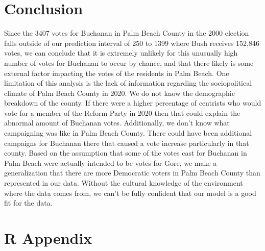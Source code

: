 \documentclass[
  letterpaper,
  DIV=11,
  numbers=noendperiod]{scrartcl}
\begin{document}
\hypertarget{conclusion}{%
\section{Conclusion}\label{conclusion}}

Since the 3407 votes for Buchanan in Palm Beach County in the 2000
election falls outside of our prediction interval of 250 to 1399 where
Bush receives 152,846 votes, we can conclude that it is extremely
unlikely for this unusually high number of votes for Buchanan to occur
by chance, and that there likely is some external factor impacting the
votes of the residents in Palm Beach. One limitation of this analysis is
the lack of information regarding the sociopolitical climate of Palm
Beach County in 2020. We do not know the demographic breakdown of the
county. If there were a higher percentage of centrists who would vote
for a member of the Reform Party in 2020 then that could explain the
abnormal amount of Buchanan votes. Additionally, we don't know what
campaigning was like in Palm Beach County. There could have been
additional campaigns for Buchanan there that caused a vote increase
particularly in that county. Based on the assumption that some of the
votes cast for Buchanan in Palm Beach were actually intended to be votes
for Gore, we make a generalization that there are more Democratic voters
in Palm Beach County than represented in our data. Without the cultural
knowledge of the environment where the data comes from, we can't be
fully confident that our model is a good fit for the data.

\hypertarget{r-appendix}{%
\section{R Appendix}\label{r-appendix}}
\end{document}
